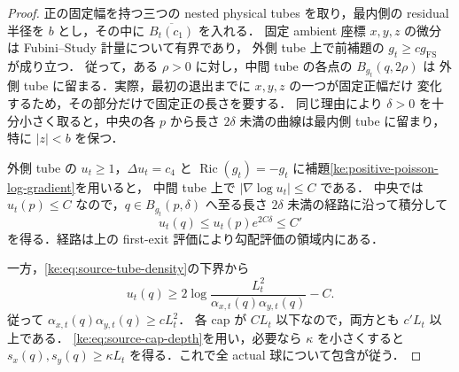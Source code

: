 \begin{proof}
正の固定幅を持つ三つの nested physical tubes を取り，最内側の residual 半径を
$b$ とし，その中に $\overline{B_t(c_1)}$ を入れる．
固定 ambient 座標 $x,y,z$ の微分は Fubini--Study 計量について有界であり，
外側 tube 上で前補題の $g_t\ge c g_{\mathrm{FS}}$ が成り立つ．
従って，ある $\rho>0$ に対し，中間 tube の各点の $B_{g_t}(q,2\rho)$ は
外側 tube に留まる．実際，最初の退出までに $x,y,z$ の一つが固定正幅だけ
変化するため，その部分だけで固定正の長さを要する．
同じ理由により $\delta>0$ を十分小さく取ると，中央の各 $p$ から長さ
$2\delta$ 未満の曲線は最内側 tube に留まり，特に $|z|<b$ を保つ．

外側 tube の $u_t\ge1$，$\Delta u_t=c_4$ と
$\operatorname{Ric}(g_t)=-g_t$ に補題\ref{ke:positive-poisson-log-gradient}を用いると，
中間 tube 上で $|\nabla\log u_t|\le C$ である．
中央では $u_t(p)\le C$ なので，$q\in B_{g_t}(p,\delta)$ へ至る長さ
$2\delta$ 未満の経路に沿って積分して
\[
 u_t(q)\le u_t(p)e^{2C\delta}\le C'
\]
を得る．経路は上の first-exit 評価により勾配評価の領域内にある．

一方，\eqref{ke:eq:source-tube-density}の下界から
\[
 u_t(q)\ge
 2\log\frac{L_t^2}{\alpha_{x,t}(q)\alpha_{y,t}(q)}-C.
\]
従って $\alpha_{x,t}(q)\alpha_{y,t}(q)\ge cL_t^2$．
各 cap が $CL_t$ 以下なので，両方とも $c'L_t$ 以上である．
\eqref{ke:eq:source-cap-depth}を用い，必要なら $\kappa$ を小さくすると
$s_x(q),s_y(q)\ge\kappa L_t$ を得る．これで全 actual 球について包含が従う．
\end{proof}
